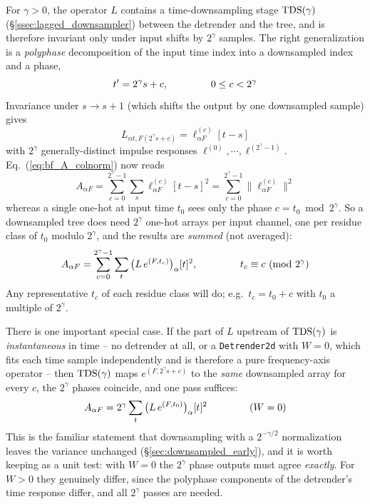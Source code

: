 \documentclass{article}
\numberwithin{equation}{section}   %
\def\TDS{{\rm TDS}}
\begin{document}
For $\gamma>0$, the operator $L$ contains a time-downsampling stage $\TDS(\gamma)$
(\S\ref{ssec:lagged_downsampler}) between the detrender and the tree, and is therefore invariant
only under input shifts by $2^\gamma$ samples. The right generalization is a {\em polyphase}
decomposition of the input time index into a downsampled index and a phase,
\begin{equation}
t' = 2^\gamma s + c, \hspace{1.5cm} 0 \le c < 2^\gamma
\end{equation}
Invariance under $s \rightarrow s+1$ (which shifts the output by one downsampled sample) gives
\begin{equation}
L_{\alpha t, F(2^\gamma s + c)} = \ell^{(c)}_{\alpha F}[t-s]
\end{equation}
with $2^\gamma$ generally-distinct impulse responses $\ell^{(0)},\cdots,\ell^{(2^\gamma-1)}$.
Eq.\ (\ref{eq:bf_A_colnorm}) now reads
\begin{equation}
A_{\alpha F} = \sum_{c=0}^{2^\gamma-1} \sum_s \ell^{(c)}_{\alpha F}[t-s]^2
  = \sum_{c=0}^{2^\gamma-1} \big\| \ell^{(c)}_{\alpha F} \big\|^2
\end{equation}
whereas a single one-hot at input time $t_0$ sees only the phase $c = t_0 \bmod 2^\gamma$.
So a downsampled tree does need $2^\gamma$ one-hot arrays per input channel, one per residue class
of $t_0$ modulo $2^\gamma$, and the results are {\em summed} (not averaged):
\begin{equation}
A_{\alpha F} = \sum_{c=0}^{2^\gamma-1} \sum_t \big( L \, e^{(F,t_c)} \big)_\alpha[t]^2,
  \hspace{1.5cm} t_c \equiv c \ (\mbox{mod } 2^\gamma)
\label{eq:bf_master_ds}
\end{equation}
Any representative $t_c$ of each residue class will do; e.g.\ $t_c = t_0 + c$ with $t_0$ a multiple
of $2^\gamma$.

There is one important special case. If the part of $L$ upstream of $\TDS(\gamma)$ is
{\em instantaneous} in time -- no detrender at all, or a {\tt Detrender2d} with $W=0$, which fits
each time sample independently and is therefore a pure frequency-axis operator -- then
$\TDS(\gamma)$ maps $e^{(F, 2^\gamma s + c)}$ to the {\em same} downsampled array for every $c$,
the $2^\gamma$ phases coincide, and one pass suffices:
\begin{equation}
A_{\alpha F} = 2^\gamma \sum_t \big( L \, e^{(F,t_0)} \big)_\alpha[t]^2
  \hspace{1.5cm} (W=0)
\end{equation}
This is the familiar statement that downsampling with a $2^{-\gamma/2}$ normalization leaves the
variance unchanged (\S\ref{sec:downsampled_early}), and it is worth keeping as a unit test: with
$W=0$ the $2^\gamma$ phase outputs must agree {\em exactly}. For $W>0$ they genuinely differ, since
the polyphase components of the detrender's time response differ, and all $2^\gamma$ passes are
needed.
\end{document}
